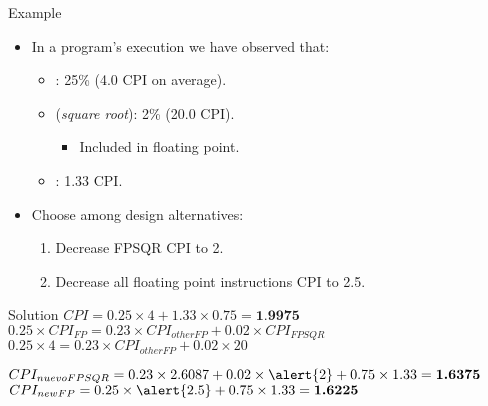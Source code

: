 \begin{frame}[t]{Example}
\begin{itemize}
  \item In a program's execution we have observed that:
    \begin{itemize}
      \item {}: 25\% (4.0 CPI on average).
      \item {} (\emph{square root}): 2\% (20.0 CPI).
        \begin{itemize}
          \item \alert{Included in floating point}.
        \end{itemize}
      \item {}: 1.33 CPI.
    \end{itemize}

  \item Choose among design alternatives:
    \begin{enumerate}[a]
      \item Decrease FPSQR CPI to 2.
      \item Decrease all floating point instructions CPI to 2.5.
    \end{enumerate}
\end{itemize}
\end{frame}

\begin{frame}[t]{Solution}
\begin{math}
CPI = 0.25 \times 4 + 1.33 \times 0.75 = \textbf{1.9975}
\end{math}
\begin{math}
0.25 \times CPI_{FP} = 0.23 \times CPI_{otherFP} + 0.02 \times CPI_{FPSQR}
\end{math}
\pause
\begin{math}
0.25 \times 4 = 0.23 \times CPI_{otherFP} + 0.02 \times 20
\end{math}

\begin{math}
CPI_{nuevoFPSQR} = 0.23 \times 2.6087 + 0.02 \times \alert{2} + 0.75 \times 1.33 = \textbf{1.6375}
\end{math}
\pause
\begin{math}
CPI_{newFP} = 0.25 \times \alert{2.5} + 0.75 \times 1.33 = \textbf{1.6225}
\end{math}
\end{frame}
